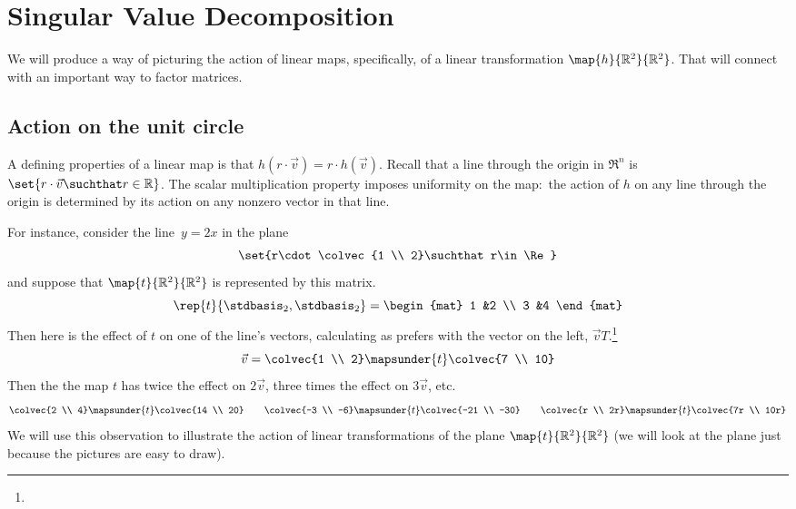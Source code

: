 \chapter{Singular Value Decomposition}
\label{chap:SingularValueDecomposition}

We will produce a way of picturing the action of linear maps,
specifically, of a linear transformation $\map{h}{\Re^2}{\Re^2}$.
That will connect with an important way to factor matrices.


\section{Action on the unit circle}
A defining properties of a linear map is that 
$h(r\cdot\vec{v})=r\cdot h(\vec{v})$.
Recall that a line through the origin in $\Re^n$ is 
$\set{r\cdot \vec{v}\suchthat r\in\Re}$. 
The scalar multiplication property  
imposes
uniformity on the map:~the action of $h$ on any 
line through the origin
is determined by its action
on any nonzero vector in that line.

For instance, consider the line~$y=2x$ in the plane
\begin{equation*}
  \set{r\cdot\colvec{1 \\ 2}\suchthat r\in\Re}
\end{equation*}
and suppose that $\map{t}{\Re^2}{\Re^2}$ is represented by this matrix.
\begin{equation*}
  \rep{t}{\stdbasis_2,\stdbasis_2}
  =
  \begin{mat}
    1 &2 \\
    3 &4
  \end{mat}
\end{equation*}
Then here is the effect of $t$ on one of the line's vectors,
calculating as \Sage{} prefers with the vector on the 
left, $\vec{v}T$.\footnote{\noterightmult}
\begin{equation*}
  \vec{v}=\colvec{1 \\ 2}\mapsunder{t}\colvec{7 \\ 10}
\end{equation*}
Then the 
the map $t$ has twice the effect on $2\vec{v}$, three times the
effect on $3\vec{v}$, etc.
\begin{equation*}
  \colvec{2 \\ 4}\mapsunder{t}\colvec{14 \\ 20}
  \qquad
  \colvec{-3 \\ -6}\mapsunder{t}\colvec{-21 \\ -30}
  \qquad
  \colvec{r \\ 2r}\mapsunder{t}\colvec{7r \\ 10r}
\end{equation*}
We will use this observation to illustrate the action of 
linear transformations of the plane $\map{t}{\Re^2}{\Re^2}$
(we will look at the plane just because the pictures are 
easy to draw). 

